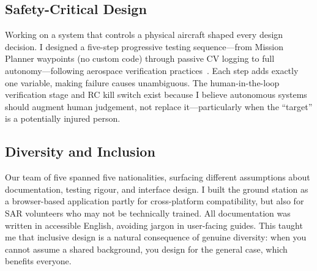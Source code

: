 \subsection{Safety-Critical Design}

Working on a system that controls a physical aircraft shaped every design decision. I designed a five-step progressive testing sequence---from Mission Planner waypoints (no custom code) through passive CV logging to full autonomy---following aerospace verification practices~\cite{koopman2019safe}. Each step adds exactly one variable, making failure causes unambiguous. The human-in-the-loop verification stage and RC kill switch exist because I believe autonomous systems should augment human judgement, not replace it---particularly when the ``target'' is a potentially injured person.

\subsection{Diversity and Inclusion}

Our team of five spanned five nationalities, surfacing different assumptions about documentation, testing rigour, and interface design. I built the ground station as a browser-based application partly for cross-platform compatibility, but also for SAR volunteers who may not be technically trained. All documentation was written in accessible English, avoiding jargon in user-facing guides. This taught me that inclusive design is a natural consequence of genuine diversity: when you cannot assume a shared background, you design for the general case, which benefits everyone.
